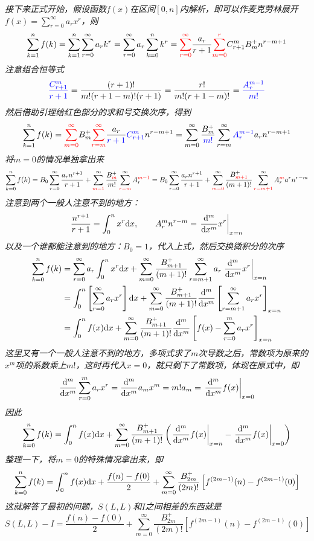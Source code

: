\documentclass[UTF8]{ctexart}
\newcommand{\trm}[1]{{\rm #1}}
\begin{document}
\textit{
    接下来正式开始，假设函数\(f(x)\)在区间\([0,n]\)内解析，即可以作麦克劳林展开\(\displaystyle{f(x)=\sum_{r=0}^{\infty}a_rx^r}\)，则
    \[\sum_{k=1}^{n}f(k) = \sum_{k=1}^{n}\sum_{r=0}^{\infty}a_rk^r=\sum_{r=0}^{\infty}a_r\sum_{k=0}^{n}k^r = {\color{red}\sum_{r=0}^{\infty}}\frac{a_r}{r+1}{\color{red}\sum_{m=0}^{r}} C_{r+1}^m B_m^+ n^{r-m+1}\]
    注意组合恒等式
    \[{\color{blue}\frac{C_{r+1}^{m}}{r+1}} = \frac{(r+1)!}{m!(r+1-m)!(r+1)}=\frac{r!}{m!(r+1-m)!} = {\color{blue}\frac{A_{r}^{m-1}}{m!}}\]
    然后借助引理给红色部分的求和号交换次序，得到
    \[\sum_{k=1}^{n}f(k) = {\color{red} \sum_{m=0}^{\infty}}B_m^+{\color{red}\sum_{r=m}^{\infty}}\frac{a_r}{\color{blue}r+1}{\color{blue}C_{r+1}^{m}}n^{r-m+1} = \sum_{m=0}^{\infty}\frac{B_m^+}{\color{blue}m!}\sum_{r=m}^{\infty}{\color{blue}A_{r}^{m-1}}a_rn^{r-m+1}\]
    将\(m=0\)的情况单独拿出来
    \[\sum_{k=0}^{n}f(k) = B_0\sum_{r=0}^{\infty}\frac{a_rn^{r+1}}{r+1} + \sum_{{\color{red} m=1}}^{\infty}\frac{B_{{\color{red}m}}^+}{m!}\sum_{{\color{red}r=m}}^{\infty}A_{r}^{{\color{red}m-1}} = B_0\sum_{r=0}^{\infty}\frac{a_rn^{r+1}}{r+1} + \sum_{{\color{red} m=0}}^{\infty}\frac{B_{{\color{red} m+1}}^+}{(m+1)!}\sum_{{\color{red}r=m+1}}^{\infty}A_r^{{\color{red}m}}a^rn^{r-m}\]
    注意到两个一般人注意不到的地方：
    \[\frac{n^{r+1}}{r+1} = \int_0^nx^r\trm{d}x ,\qquad A_r^mn^{r-m} = \left.\frac{\trm{d}^m}{\trm{d}x^m}x^r\right|_{x=n}\]
    以及一个谁都能注意到的地方：\(B_0=1\)，代入上式，然后交换微积分的次序
    \begin{align*}
        \sum_{k=0}^{n}f(k) &= \sum_{r=0}^{\infty}a_r\int_0^nx^r\trm{d}x + \sum_{m=0}^{\infty}\frac{B_{m+1}^+}{(m+1)!}\sum_{r=m+1}^{\infty}a_r\left.\frac{\trm{d}^m}{\trm{d}x^m}x^r\right|_{x=n} \\
        &= \int_0^n\left[\sum_{r=0}^{\infty}a_rx^r\right]\trm{d}x + \sum_{m=0}^{\infty}\frac{B_{m+1}^+}{(m+1)!}\frac{\trm{d}^m}{\trm{d}x^m}\left[\sum_{r=m+1}^{\infty}a_rx^r\right]_{x=n} \\
        &= \int_0^nf(x)\trm{d}x + \sum_{m=0}^{\infty}\frac{B_{m+1}^+}{(m+1)!}\frac{\trm{d}^m}{\trm{d}x^m}\left[f(x) - \sum_{r=0}^{m}a_rx^r\right]_{x=n}
    \end{align*}
    这里又有一个一般人注意不到的地方，多项式求了\(m\)次导数之后，常数项为原来的\(x^m\)项的系数乘上\(m!\)，这时再代入\(x=0\)，就只剩下了常数项，体现在原式中，即
    \[\frac{\trm{d}^m}{\trm{d}x^m}\sum_{r=0}^{m}a_rx^r = \frac{\trm{d}^m}{\trm{d}x^m}a_mx^m = m!a_m = \left.\frac{\trm{d}^m}{\trm{d}x^m}f(x)\right|_{x=0}\]
    因此
    \[\sum_{k=0}^{n}f(k) = \int_0^nf(x)\trm{d}x + \sum_{m=0}^{\infty}\frac{B_{m+1}^+}{(m+1)!}\left(\left.\frac{\trm{d}^m}{\trm{d}x^m}f(x)\right|_{x=n} - \left.\frac{\trm{d}^m}{\trm{d}x^m}f(x)\right|_{x=0}\right)\]
    整理一下，将\(m=0\)的特殊情况拿出来，即
    \[\sum_{k=0}^{n}f(k) = \int_0^nf(x)\trm{d}x + \frac{f(n)-f(0)}{2} + \sum_{m=0}^{\infty}\frac{B_{2m}^+}{(2m)!}\left[f^{(2m-1)}(n) - f^{(2m-1)}(0)\right]\]
    这就解答了最初的问题，\(S(L,L)\)和\(I\)之间相差的东西就是
    \[S(L,L) - I = \frac{f(n)-f(0)}{2} + \sum_{m=0}^{\infty}\frac{B_{2m}^+}{(2m)!}\left[f^{(2m-1)}(n) - f^{(2m-1)}(0)\right]\]
}
\end{document}
